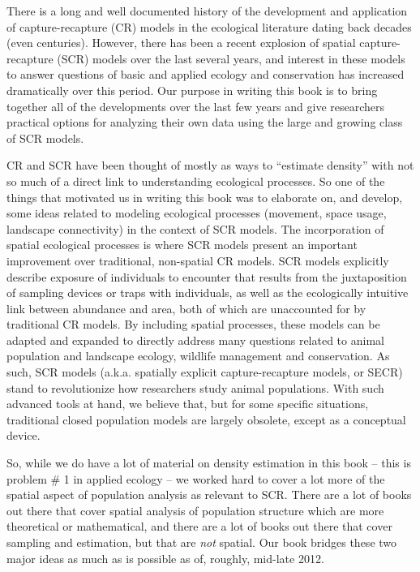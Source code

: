 There is a long and well documented history of the development and
application of capture-recapture (CR) models in the ecological
literature dating back decades (even centuries).  However, there %
has been a recent explosion of spatial capture-recapture (SCR) models
over the last several years, and interest in these models to answer
questions of basic and applied ecology and conservation has increased
dramatically over this period.  Our purpose in writing this book is to
bring together all of the developments over the last few years and
give researchers practical options for analyzing their own data using
the large and growing class of SCR models.

CR and SCR have been thought of mostly as ways to ``estimate density''
with not so much of a direct link to understanding ecological
processes. So one of the things that motivated us in writing this book was to elaborate on,
and develop, some ideas related to modeling ecological processes
(movement, space usage, landscape connectivity) in the context of SCR
models.  The incorporation of spatial ecological processes is where SCR models present an important improvement
over traditional, non-spatial CR models.  SCR models explicitly
describe exposure of individuals to encounter 
that results from the
juxtaposition of sampling devices or traps with individuals, as well
as the ecologically intuitive link between abundance and area, both of
which are unaccounted for by traditional CR models. By including
spatial processes, these models can be adapted and expanded to
directly address many questions related to animal population and
landscape ecology, wildlife management and conservation.  As such, SCR
models (a.k.a.  spatially explicit capture-recapture models, or SECR)
stand to revolutionize how researchers study animal populations.  With
such advanced tools at hand, we believe that, but for some specific
situations, traditional closed population models are largely obsolete,
except as a conceptual device.

So, while we do have a lot of material on density estimation in this
book -- this is problem \# 1 in applied ecology -- we worked hard to
cover a lot more of the spatial aspect of population analysis as
relevant to SCR.  There are a lot of books out there that cover
spatial analysis of population structure which are more theoretical or
mathematical, and there are a lot of books out there that cover
sampling and estimation, but that are {\it not} spatial. Our book
bridges these two major ideas as much as is possible as of, roughly,
mid-late 2012.

